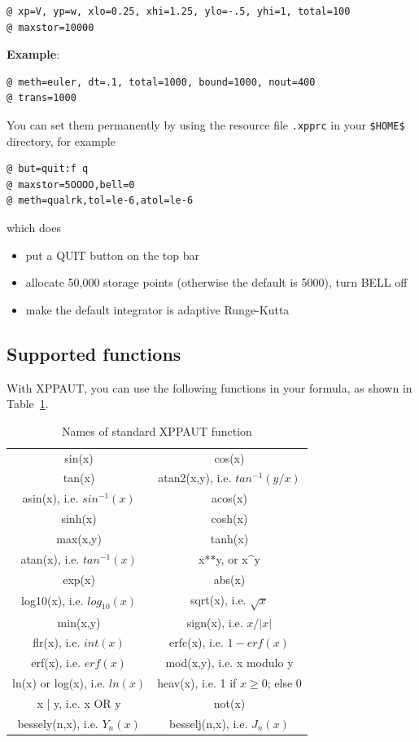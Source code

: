 \begin{lstlisting}
@ xp=V, yp=w, xlo=0.25, xhi=1.25, ylo=-.5, yhi=1, total=100
@ maxstor=10000
\end{lstlisting}

{\bf Example}: 
\begin{lstlisting}
@ meth=euler, dt=.1, total=1000, bound=1000, nout=400
@ trans=1000
\end{lstlisting}

You can set them permanently by using the resource file \verb!.xpprc!
in your \verb!$HOME$! directory, for example
\begin{verbatim}
@ but=quit:f q
@ maxstor=5OOOO,bell=0
@ meth=qualrk,tol=le-6,atol=le-6
\end{verbatim}
which does
\begin{itemize}
\item put a QUIT button on the top bar
\item allocate 50,000 storage points (otherwise the default is 5000), turn BELL off
\item make the default integrator is adaptive Runge-Kutta
\end{itemize}

\subsection{Supported functions}
\label{sec:supported-functions}

With XPPAUT, you can use the following functions in your formula, as
shown in Table~\ref{tab:xppaut_func}.
\begin{table}[tbh]
  \centering
  \begin{tabular}{|c|c|}
    sin(x) & cos(x) \\
    tan(x) & atan2(x,y), i.e. $tan^{-1}(y/x)$ \\
    asin(x), i.e. $sin^{-1}(x)$ & acos(x) \\
    sinh(x) & cosh(x) \\
    max(x,y) & tanh(x) \\
    atan(x), i.e. $tan^{-1}(x)$ & x**y, or x\^{}y \\
    exp(x) & abs(x) \\
    log10(x),  i.e. $log_{10}(x)$ & sqrt(x), i.e. $\sqrt{x}$\\
    min(x,y) & sign(x), i.e. $x/|x|$ \\
    flr(x), i.e. $int(x)$ & erfc(x), i.e. $1-erf(x)$ \\
    erf(x), i.e. $erf(x)$ & mod(x,y), i.e. x modulo y\\
    ln(x) or log(x), i.e. $ln(x)$ & heav(x), i.e. 1 if $x\ge 0$; else
    0 \\
    x | y, i.e. x OR y & not(x) \\
    bessely(n,x), i.e. $Y_n(x)$ & besselj(n,x), i.e. $J_n(x)$
  \end{tabular}
  \caption{Names of standard XPPAUT function}
  \label{tab:xppaut_func}
\end{table}


